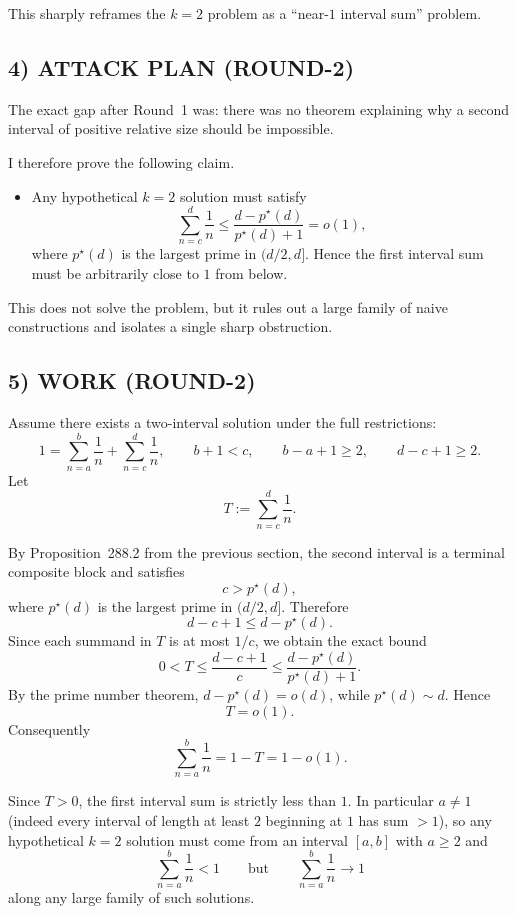 This sharply reframes the $k=2$ problem as a ``near-$1$ interval sum'' problem.

\subsection*{4) ATTACK PLAN (ROUND-2)}
The exact gap after Round~1 was: there was no theorem explaining why a second interval of positive relative size should be impossible.

I therefore prove the following claim.

\begin{itemize}
	\item[(C)] Any hypothetical $k=2$ solution must satisfy
	\[
	\sum_{n=c}^d \frac1n\le \frac{d-p^\star(d)}{p^\star(d)+1}=o(1),
	\]
	where $p^\star(d)$ is the largest prime in $(d/2,d]$. Hence the first interval sum must be arbitrarily close to $1$ from below.
\end{itemize}

This does not solve the problem, but it rules out a large family of naive constructions and isolates a single sharp obstruction.

\subsection*{5) WORK (ROUND-2)}

Assume there exists a two-interval solution under the full restrictions:
\[
1=\sum_{n=a}^b\frac1n+\sum_{n=c}^d\frac1n,
\qquad b+1<c,
\qquad b-a+1\ge 2,
\qquad d-c+1\ge 2.
\]
Let
\[
T:=\sum_{n=c}^d\frac1n.
\]

By Proposition~288.2 from the previous section, the second interval is a terminal composite block and satisfies
\[
c>p^\star(d),
\]
where $p^\star(d)$ is the largest prime in $(d/2,d]$. Therefore
\[
d-c+1\le d-p^\star(d).
\]
Since each summand in $T$ is at most $1/c$, we obtain the exact bound
\[
0<T\le \frac{d-c+1}{c}
\le \frac{d-p^\star(d)}{p^\star(d)+1}.
\]
By the prime number theorem, $d-p^\star(d)=o(d)$, while $p^\star(d)\sim d$. Hence
\[
T=o(1).
\]
Consequently
\[
\sum_{n=a}^b\frac1n=1-T=1-o(1).
\]

Since $T>0$, the first interval sum is strictly less than $1$. In particular $a\neq 1$ (indeed every interval of length at least $2$ beginning at $1$ has sum $>1$), so any hypothetical $k=2$ solution must come from an interval $[a,b]$ with $a\ge 2$ and
\[
\sum_{n=a}^b\frac1n<1
\qquad\text{but}\qquad
\sum_{n=a}^b\frac1n\to 1
\]
along any large family of such solutions.

